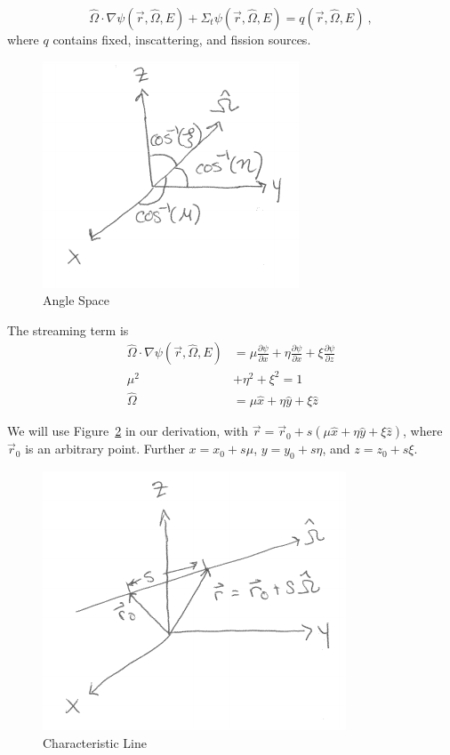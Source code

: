 \documentclass[12pt]{article}
\newcommand{\rvec}{\ensuremath{\vec{r}}}
\newcommand{\vOmega}{\ensuremath{\hat{\Omega}}}
\begin{document}
\[\vOmega \cdot \nabla \psi(\rvec, \vOmega, E) + \Sigma_t \psi(\rvec, \vOmega, E) = q(\rvec, \vOmega, E)\:,\]
where $q$ contains fixed, inscattering, and fission sources. \\

\begin{figure}[h!] 
    \label{fig:cosines}
    \begin{center}
    \includegraphics[keepaspectratio, width = 2 in]{../figs/cosines}
    \end{center}    
    \caption{Angle Space}
    \label{fig:angles}
\end{figure}
%
The streaming term is 
\begin{align*}
\vOmega \cdot \nabla \psi(\rvec, \vOmega, E) &= \mu \frac{\partial \psi}{\partial x} + \eta \frac{\partial \psi}{\partial x} + \xi \frac{\partial \psi}{\partial z} \\
\mu^2 &+ \eta^2 + \xi^2 = 1 \\
\vOmega &= \mu \hat{x} + \eta \hat{y} + \xi \hat{z}
\end{align*}
%

We will use Figure~\ref{fig:stream} in our derivation, with $\vec{r} = \rvec_0 + s(\mu \hat{x} + \eta \hat{y} + \xi \hat{z})$, where $\rvec_0$ is an arbitrary point.
Further $x = x_0 + s\mu$, $y = y_0 + s\eta$, and $z = z_0 + s\xi$.
%
\begin{figure}[h!] 
    \begin{center}
    \includegraphics[keepaspectratio, width = 2.5 in]{../figs/moc-stream}    
    \end{center}   
    \caption{Characteristic Line}
    \label{fig:stream}
\end{figure}
\end{document}
